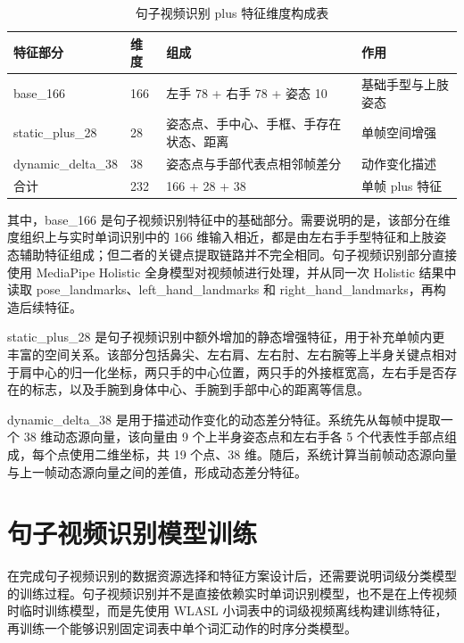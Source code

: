 

\begin{longtable}{L{0.22\textwidth} L{0.12\textwidth} L{0.34\textwidth} L{0.24\textwidth}}
  \caption{句子视频识别 plus 特征维度构成表}
  \label{tab:chapter06-plus-feature-dim}\\
  \toprule
  特征部分 & 维度 & 组成 & 作用 \\
  \midrule
  base\_166 & 166 & 左手 78 + 右手 78 + 姿态 10 & 基础手型与上肢姿态 \\
  static\_plus\_28 & 28 & 姿态点、手中心、手框、手存在状态、距离 & 单帧空间增强 \\
  dynamic\_delta\_38 & 38 & 姿态点与手部代表点相邻帧差分 & 动作变化描述 \\
  合计 & 232 & 166 + 28 + 38 & 单帧 plus 特征 \\
  \bottomrule
\end{longtable}

其中，base\_166 是句子视频识别特征中的基础部分。需要说明的是，该部分在维度组织上与实时单词识别中的 166 维输入相近，都是由左右手手型特征和上肢姿态辅助特征组成；但二者的关键点提取链路并不完全相同。句子视频识别部分直接使用 MediaPipe Holistic 全身模型对视频帧进行处理，并从同一次 Holistic 结果中读取 pose\_landmarks、left\_hand\_landmarks 和 right\_hand\_landmarks，再构造后续特征。

static\_plus\_28 是句子视频识别中额外增加的静态增强特征，用于补充单帧内更丰富的空间关系。该部分包括鼻尖、左右肩、左右肘、左右腕等上半身关键点相对于肩中心的归一化坐标，两只手的中心位置，两只手的外接框宽高，左右手是否存在的标志，以及手腕到身体中心、手腕到手部中心的距离等信息。

dynamic\_delta\_38 是用于描述动作变化的动态差分特征。系统先从每帧中提取一个 38 维动态源向量，该向量由 9 个上半身姿态点和左右手各 5 个代表性手部点组成，每个点使用二维坐标，共 19 个点、38 维。随后，系统计算当前帧动态源向量与上一帧动态源向量之间的差值，形成动态差分特征。

\section{句子视频识别模型训练}

在完成句子视频识别的数据资源选择和特征方案设计后，还需要说明词级分类模型的训练过程。句子视频识别并不是直接依赖实时单词识别模型，也不是在上传视频时临时训练模型，而是先使用 WLASL 小词表中的词级视频离线构建训练特征，再训练一个能够识别固定词表中单个词汇动作的时序分类模型。

